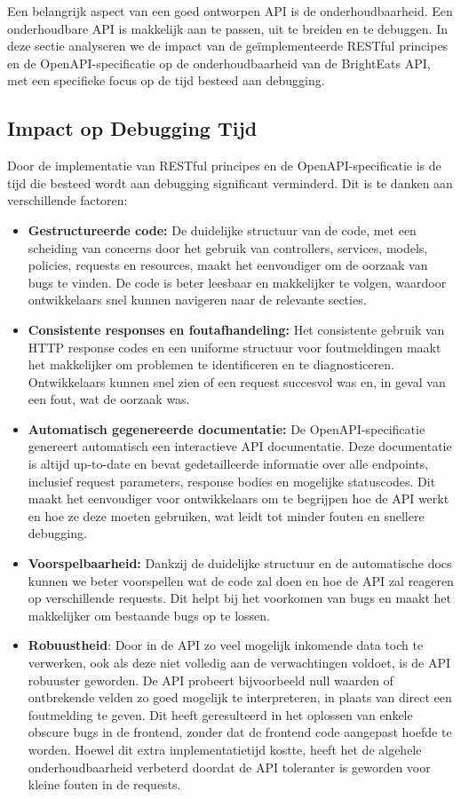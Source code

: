 Een belangrijk aspect van een goed ontworpen API is de onderhoudbaarheid. Een onderhoudbare API is makkelijk aan te passen, uit te breiden en te debuggen. In deze sectie analyseren we de impact van de geïmplementeerde RESTful principes en de OpenAPI-specificatie op de onderhoudbaarheid van de BrightEats API, met een specifieke focus op de tijd besteed aan debugging.

\subsection{Impact op Debugging Tijd}

Door de implementatie van RESTful principes en de OpenAPI-specificatie is de tijd die besteed wordt aan debugging significant verminderd. Dit is te danken aan verschillende factoren:

\begin{itemize}
\item \textbf{Gestructureerde code:} De duidelijke structuur van de code, met een scheiding van concerns door het gebruik van controllers, services, models, policies, requests en resources, maakt het eenvoudiger om de oorzaak van bugs te vinden. De code is beter leesbaar en makkelijker te volgen, waardoor ontwikkelaars snel kunnen navigeren naar de relevante secties.
\item \textbf{Consistente responses en foutafhandeling:} Het consistente gebruik van HTTP response codes en een uniforme structuur voor foutmeldingen maakt het makkelijker om problemen te identificeren en te diagnosticeren. Ontwikkelaars kunnen snel zien of een request succesvol was en, in geval van een fout, wat de oorzaak was.
\item \textbf{Automatisch gegenereerde documentatie:} De OpenAPI-specificatie genereert automatisch een interactieve API documentatie. Deze documentatie is altijd up-to-date en bevat gedetailleerde informatie over alle endpoints, inclusief request parameters, response bodies en mogelijke statuscodes. Dit maakt het eenvoudiger voor ontwikkelaars om te begrijpen hoe de API werkt en hoe ze deze moeten gebruiken, wat leidt tot minder fouten en snellere debugging.
\item \textbf{Voorspelbaarheid:} Dankzij de duidelijke structuur en de automatische docs kunnen we beter voorspellen wat de code zal doen en hoe de API zal reageren op verschillende requests. Dit helpt bij het voorkomen van bugs en maakt het makkelijker om bestaande bugs op te lossen.
\item \textbf{Robuustheid}: Door in de API zo veel mogelijk inkomende data toch te verwerken, ook als deze niet volledig aan de verwachtingen voldoet, is de API robuuster geworden. De API probeert bijvoorbeeld null waarden of ontbrekende velden zo goed mogelijk te interpreteren, in plaats van direct een foutmelding te geven. Dit heeft geresulteerd in het oplossen van enkele obscure bugs in de frontend, zonder dat de frontend code aangepast hoefde te worden. Hoewel dit extra implementatietijd kostte, heeft het de algehele onderhoudbaarheid verbeterd doordat de API toleranter is geworden voor kleine fouten in de requests.
\end{itemize}

